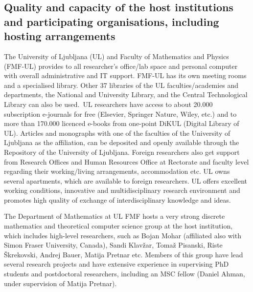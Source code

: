 \subsection{Quality and capacity of the host institutions and participating organisations, including hosting arrangements}
\label{sec:implementationmangement}
The University of Ljubljana (UL) and Faculty of Mathematics and Physics (FMF-UL) provides to all researcher’s office/lab space and personal computer with overall administrative and IT support.
FMF-UL has its own meeting rooms and a specialised library.
Other 37 libraries of the UL faculties/academies and departments, the National and University Library, and the Central Technological Library can also be used. UL researchers have access to about 20.000 subscription e-journals for free (Elsevier, Springer Nature, Wiley, etc.) and to more than 170.000 licenced e-books from one-point DiKUL (Digital Library of UL).
Articles and monographs with one of the faculties of the University of Ljubljana as the affiliation, can be deposited and openly available through the Repository of the University of Ljubljana. Foreign researchers also get support from Research Offices and Human Resources Office at Rectorate and faculty level regarding their working/living arrangements, accommodation etc. UL owns several apartments, which are available to foreign researchers. UL offers excellent working conditions, innovative and multidisciplinary research environment and promotes high quality of exchange of interdisciplinary knowledge and ideas.


The Department of Mathematics at UL FMF hosts a very strong discrete mathematics and theoretical computer science group at the host institution, which includes high-level researchers, such as 
 Bojan Mohar (affiliated also with Simon Fraser University, Canada), Sandi Klavžar, Tomaž Pisanski, Riste Škrekovski, Andrej Bauer, Matija Pretnar etc.
Members of this group have lead several research projects and have extensive experience in supervising PhD students and postdoctoral researchers,
including an MSC fellow (Daniel Ahman, under supervision of Matija Pretnar).






%
%

